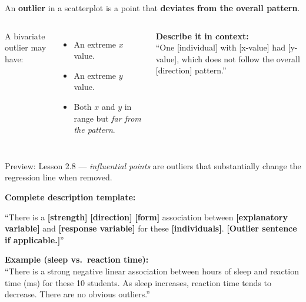 \documentclass[aspectratio=169, 11pt]{beamer}
\begin{document}
\begin{frame}[t, plain]
  \vspace{0.3cm}
  An \textbf{outlier} in a scatterplot is a point that \textbf{deviates from the overall pattern}.
  \vspace{0.4cm}
  \begin{columns}
      A bivariate outlier may have:
      \begin{itemize}
        \item An extreme $x$ value.
        \item An extreme $y$ value.
        \item Both $x$ and $y$ in range but \textit{far from the pattern}.
      \end{itemize}
      \textbf{Describe it in context:}\\[0.2cm]
      ``One [individual] with [x-value] had [y-value], which does not follow the overall [direction] pattern.''
  \end{columns}
  \vspace{0.5cm}
  \textcolor{navy!70}{\small Preview: Lesson 2.8 --- \textit{influential points} are outliers that substantially change the regression line when removed.}
\end{frame}

\begin{frame}[t, plain]
  \vspace{0.3cm}
  \textbf{Complete description template:}\\[0.4cm]
  \begin{block}{}
    ``There is a \textbf{[strength]} \textbf{[direction]} \textbf{[form]} association between
    \textbf{[explanatory variable]} and \textbf{[response variable]} for these \textbf{[individuals]}.
    \textbf{[Outlier sentence if applicable.]}''
  \end{block}
  \vspace{0.4cm}
  \textbf{Example (sleep vs.\ reaction time):}\\[0.2cm]
  ``There is a strong negative linear association between hours of sleep and reaction time (ms)
  for these 10 students. As sleep increases, reaction time tends to decrease. There are no
  obvious outliers.''
\end{frame}
\end{document}
